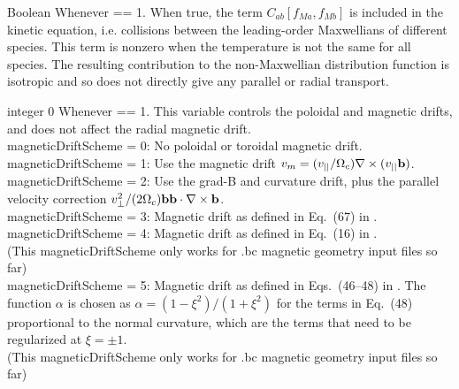 \myhrule

{Boolean}
{\false}
{Whenever  == 1.}
{When true, the term $C_{ab}[ f_{Ma}, f_{Mb}]$ is included in the kinetic equation,
i.e. collisions between the leading-order Maxwellians of different species.  This term is nonzero
when the temperature is not the same for all species.  The resulting contribution to the non-Maxwellian
distribution function is isotropic and so does not directly give any parallel or radial transport.}

\myhrule

{integer}
{0}
{Whenever  == 1.}
{This variable controls the poloidal and magnetic drifts, and does not affect the radial magnetic drift.\\

{\ttfamily magneticDriftScheme} = 0: No poloidal or toroidal magnetic drift.\\

{\ttfamily magneticDriftScheme} = 1: Use the magnetic drift $v_m = (v_{||} / \Omega_c) \nabla \times (v_{||} {\mathbf b})$.\\

{\ttfamily magneticDriftScheme} = 2: Use the grad-B and curvature
drift, plus the parallel velocity correction $v_{\perp}^2/(2 \Omega_c)
{\mathbf b} {\mathbf b} \cdot \nabla \times {\mathbf b}$.\\

{\ttfamily magneticDriftScheme} = 3: Magnetic drift as defined in
Eq.~(67) in \cite{Kasilov2014}.\\

{\ttfamily magneticDriftScheme} = 4: Magnetic drift as defined in
Eq.~(16) in \cite{Martitsch2016}.\\ (This {\ttfamily
  magneticDriftScheme} only works for .bc magnetic
geometry input files so far)\\

{\ttfamily magneticDriftScheme} = 5: Magnetic drift as defined in
Eqs.~(46--48) in \cite{Sugama2016}. The function $\alpha$
 is chosen as $\alpha=(1-\xi^2)/(1+\xi^2)$ for the terms
in Eq.~(48) proportional to the normal curvature, which are the terms
that need
to be regularized at $\xi=\pm 1$.\\
(This {\ttfamily magneticDriftScheme} only works for .bc magnetic
geometry input files so far)\\


}








